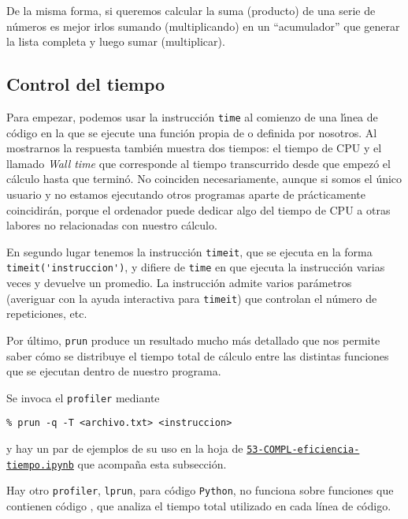 De la misma forma, si queremos calcular la suma (producto) de una serie de
n\'umeros es mejor irlos sumando (multiplicando) en un ``acumulador'' que
generar la lista
completa y luego sumar (multiplicar). 
 
 \subsection{Control del tiempo}\label{time}

Para empezar, podemos usar la instrucción \lstinline|time| al comienzo de una
l\'{\i}nea de c\'odigo en la que se ejecute una funci\'on propia de {\sage} o
definida por nosotros. Al mostrarnos la respuesta también muestra dos
tiempos: el tiempo de CPU y el llamado {\itshape Wall time} que corresponde al
tiempo transcurrido desde que empez\'o el c\'alculo hasta que termin\'o. No
coinciden necesariamente, aunque si somos el \'unico usuario y no estamos
ejecutando otros programas aparte de {\sage} pr\'acticamente coincidir\'an,  
porque el ordenador puede dedicar algo del tiempo de CPU a otras labores no
relacionadas con nuestro c\'alculo.




En segundo lugar tenemos la instrucci\'on \lstinline|timeit|, que se ejecuta en
la
forma 
\lstinline|timeit('instruccion')|, y difiere de \lstinline|time| en que ejecuta
la
instrucci\'on
varias veces y devuelve un promedio. La instrucci\'on admite varios par\'ametros
(averiguar con la ayuda interactiva para \lstinline|timeit|) que controlan el
n\'umero de
repeticiones, etc.

Por \'ultimo, \lstinline|prun| produce un resultado mucho m\'as detallado
que nos
permite saber 
c\'omo se distribuye el tiempo total de c\'alculo entre las distintas funciones
que se ejecutan dentro de nuestro programa. 



Se invoca el {\tt profiler} mediante

\begin{lstlisting}
% prun -q -T <archivo.txt> <instruccion>
\end{lstlisting}
y hay un par de ejemplos de su uso en la hoja de {\sage} 
\href{http://localhost:8888/notebooks/PROGR/COMPL/53-COMPL-eficiencia-tiempo.ipynb}{\tt 53-COMPL-eficiencia-tiempo.ipynb} que acompa\~na esta subsecci\'on.


Hay otro {\tt profiler},  \lstinline|lprun|,  para c\'odigo \lstinline|Python|, no funciona sobre funciones que contienen c\'odigo {\sage}, que analiza el tiempo total utilizado en cada l\'inea de c\'odigo. 

